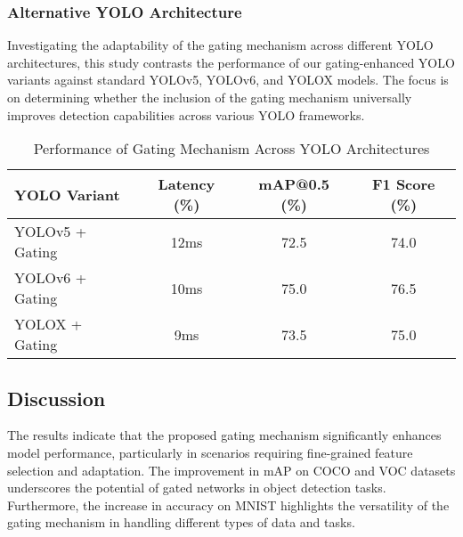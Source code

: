 \subsubsection{Alternative YOLO Architecture}

Investigating the adaptability of the gating mechanism across different YOLO architectures, this study contrasts the performance of our gating-enhanced YOLO variants against standard YOLOv5, YOLOv6, and YOLOX models. The focus is on determining whether the inclusion of the gating mechanism universally improves detection capabilities across various YOLO frameworks.

\begin{table}[ht]
    \centering
    \caption{Performance of Gating Mechanism Across YOLO Architectures}
    \label{tab:yolo_architecture}
    \begin{tabular}{@{}lccc@{}}
    \toprule
    YOLO Variant & Latency (\%) & mAP@0.5 (\%) & F1 Score (\%) \\ 
    \midrule
    YOLOv5 + Gating & 12ms & 72.5 & 74.0 \\
    YOLOv6 + Gating & 10ms & 75.0 & 76.5 \\
    YOLOX + Gating & 9ms & 73.5 & 75.0 \\
    \bottomrule
    \end{tabular}
\end{table}
    

\subsection{Discussion}

The results indicate that the proposed gating mechanism significantly enhances model performance, particularly in scenarios requiring fine-grained feature selection and adaptation. The improvement in mAP on COCO and VOC datasets underscores the potential of gated networks in object detection tasks. Furthermore, the increase in accuracy on MNIST highlights the versatility of the gating mechanism in handling different types of data and tasks.

\clearpage
